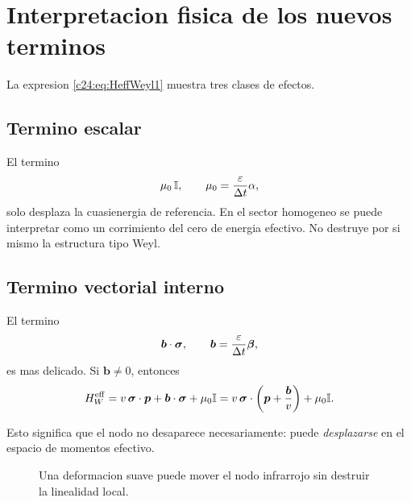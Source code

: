 \section{Interpretacion fisica de los nuevos terminos}
La expresion \eqref{c24:eq:HeffWeyl1} muestra tres clases de efectos.

\subsection{Termino escalar}
El termino
\begin{equation}
\mu_0\,\mathbb{I},
\qquad
\mu_0=\frac{\varepsilon}{\Delta t}\alpha,
\end{equation}
solo desplaza la cuasienergia de referencia. En el sector homogeneo se puede interpretar como un corrimiento del cero de energia efectivo. No destruye por si mismo la estructura tipo Weyl.

\subsection{Termino vectorial interno}
El termino
\begin{equation}
\bm{b}\cdot\bm{\sigma},
\qquad
\bm{b}=\frac{\varepsilon}{\Delta t}\bm{\beta},
\end{equation}
es mas delicado. Si \(\bm{b}\neq 0\), entonces
\begin{equation}
H_W^{\mathrm{eff}} = v\,\bm{\sigma}\cdot\bm{p}+\bm{b}\cdot\bm{\sigma}+\mu_0\mathbb{I}
=
v\,\bm{\sigma}\cdot\left(\bm{p}+\frac{\bm{b}}{v}\right)+\mu_0\mathbb{I}.
\end{equation}

Esto significa que el nodo no desaparece necesariamente: puede \emph{desplazarse} en el espacio de momentos efectivo.

\begin{figure}[h!]
\centering
{}
\caption{Una deformacion suave puede mover el nodo infrarrojo sin destruir la linealidad local.}
\end{figure}

